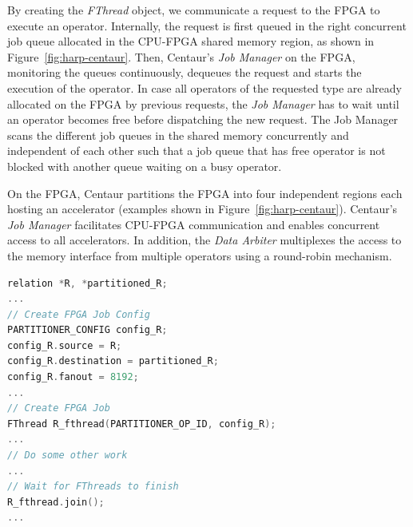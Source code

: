 \documentclass[11pt,dvipdfm]{article}
\begin{document}
By creating the \emph{FThread} object, we communicate a request to the FPGA to execute an operator. Internally, the request is first queued in the right concurrent job queue allocated in the CPU-FPGA shared memory region, as shown in Figure~\ref{fig:harp-centaur}. Then, Centaur's \emph{Job Manager} on the FPGA, monitoring the queues continuously, dequeues the request and starts the execution of the operator. In case all operators of the requested type are already allocated on the FPGA by previous requests, the \emph{Job Manager} has to wait until an operator becomes free before dispatching the new request. The Job Manager scans the different job queues in the shared memory concurrently and independent of each other such that a job queue that has free operator is not blocked with another queue waiting on a busy operator.

On the FPGA, Centaur partitions the FPGA into four independent regions each hosting an accelerator (examples shown in Figure~\ref{fig:harp-centaur}). Centaur's \emph{Job Manager} facilitates CPU-FPGA communication and enables concurrent access to all accelerators. In addition, the \emph{Data Arbiter} multiplexes the access to the memory interface from multiple operators using a round-robin mechanism. 

\begin{lstlisting}[float=tp,frame=single,breaklines=true,language=C++, basicstyle=\footnotesize, label=centaur_op,caption=An FPGA operator representation in Centaur., keywords={FThread, join}]
relation *R, *partitioned_R;
...
// Create FPGA Job Config
PARTITIONER_CONFIG config_R;
config_R.source = R;
config_R.destination = partitioned_R;
config_R.fanout = 8192;
...
// Create FPGA Job
FThread R_fthread(PARTITIONER_OP_ID, config_R);
...
// Do some other work
...
// Wait for FThreads to finish
R_fthread.join();
...
\end{lstlisting}

\end{document}
